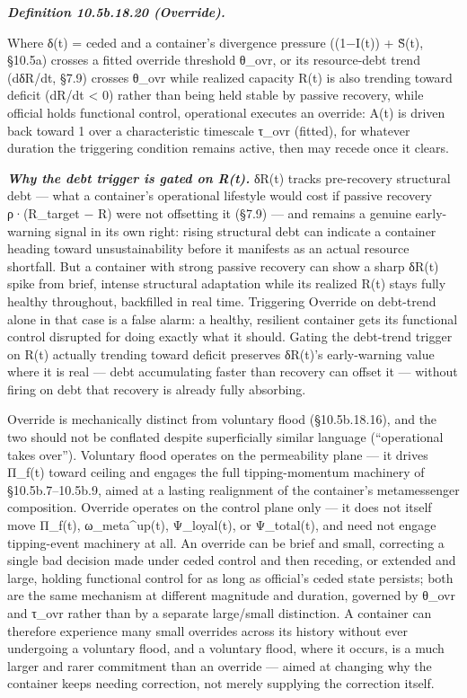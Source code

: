 \documentclass[
]{article}
\begin{document}
\emph{\textbf{Definition 10.5b.18.20 (Override).}}

Where δ(t) = ceded and a container's divergence pressure ((1−I(t)) +
S̃(t), §10.5a) crosses a fitted override threshold θ\_ovr, or its
resource-debt trend (dδR/dt, §7.9) crosses θ\_ovr while realized
capacity R(t) is also trending toward deficit (dR/dt \textless{} 0)
rather than being held stable by passive recovery, while official holds
functional control, operational executes an override: A(t) is driven
back toward 1 over a characteristic timescale τ\_ovr (fitted), for
whatever duration the triggering condition remains active, then may
recede once it clears.

\emph{\textbf{Why the debt trigger is gated on R(t).}} δR(t) tracks
pre-recovery structural debt --- what a container's operational
lifestyle would cost if passive recovery ρ·(R\_target − R) were not
offsetting it (§7.9) --- and remains a genuine early-warning signal in
its own right: rising structural debt can indicate a container heading
toward unsustainability before it manifests as an actual resource
shortfall. But a container with strong passive recovery can show a sharp
δR(t) spike from brief, intense structural adaptation while its realized
R(t) stays fully healthy throughout, backfilled in real time. Triggering
Override on debt-trend alone in that case is a false alarm: a healthy,
resilient container gets its functional control disrupted for doing
exactly what it should. Gating the debt-trend trigger on R(t) actually
trending toward deficit preserves δR(t)'s early-warning value where it
is real --- debt accumulating faster than recovery can offset it ---
without firing on debt that recovery is already fully absorbing.

Override is mechanically distinct from voluntary flood (§10.5b.18.16),
and the two should not be conflated despite superficially similar
language (``operational takes over''). Voluntary flood operates on the
permeability plane --- it drives Π\_f(t) toward ceiling and engages the
full tipping-momentum machinery of §10.5b.7--10.5b.9, aimed at a lasting
realignment of the container's metamessenger composition. Override
operates on the control plane only --- it does not itself move Π\_f(t),
ω\_meta\^{}up(t), Ψ\_loyal(t), or Ψ\_total(t), and need not engage
tipping-event machinery at all. An override can be brief and small,
correcting a single bad decision made under ceded control and then
receding, or extended and large, holding functional control for as long
as official's ceded state persists; both are the same mechanism at
different magnitude and duration, governed by θ\_ovr and τ\_ovr rather
than by a separate large/small distinction. A container can therefore
experience many small overrides across its history without ever
undergoing a voluntary flood, and a voluntary flood, where it occurs, is
a much larger and rarer commitment than an override --- aimed at
changing why the container keeps needing correction, not merely
supplying the correction itself.
\end{document}
